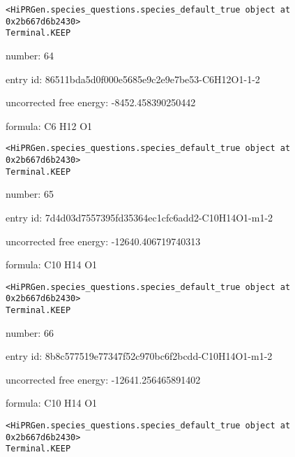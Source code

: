 \documentclass{article}
\begin{document}
\vspace{1cm}
\begin{verbatim}
<HiPRGen.species_questions.species_default_true object at 0x2b667d6b2430>
Terminal.KEEP
\end{verbatim}


number: 64



entry id: 86511bda5d0f000e5685e9c2e9e7be53-C6H12O1-1-2



uncorrected free energy: -8452.458390250442



formula: C6 H12 O1


\vspace{1cm}
\begin{verbatim}
<HiPRGen.species_questions.species_default_true object at 0x2b667d6b2430>
Terminal.KEEP
\end{verbatim}


number: 65



entry id: 7d4d03d7557395fd35364ec1cfc6add2-C10H14O1-m1-2



uncorrected free energy: -12640.406719740313



formula: C10 H14 O1


\vspace{1cm}
\begin{verbatim}
<HiPRGen.species_questions.species_default_true object at 0x2b667d6b2430>
Terminal.KEEP
\end{verbatim}


number: 66



entry id: 8b8c577519e77347f52c970bc6f2bcdd-C10H14O1-m1-2



uncorrected free energy: -12641.256465891402



formula: C10 H14 O1


\vspace{1cm}
\begin{verbatim}
<HiPRGen.species_questions.species_default_true object at 0x2b667d6b2430>
Terminal.KEEP
\end{verbatim}
\end{document}
